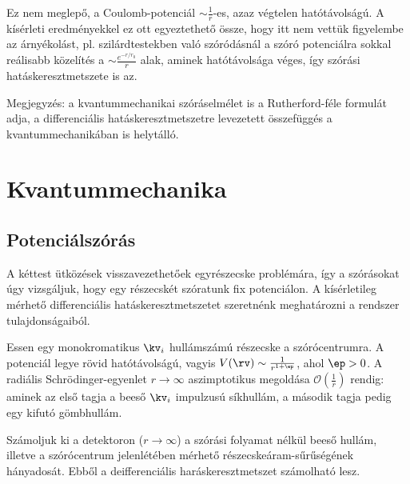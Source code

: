    Ez nem meglepő, a Coulomb-potenciál $\sim\frac{1}{r}$-es, azaz végtelen hatótávolságú.
   A kísérleti eredményekkel ez ott egyeztethető össze, hogy itt nem vettük figyelembe az árnyékolást, pl. szilárdtestekben való szóródásnál a szóró potenciálra sokkal reálisabb közelítés a $\sim\frac{e^{-r/r_0}}{r}$ alak, aminek hatótávolsága véges, így szórási hatáskeresztmetszete is az.
   
   Megjegyzés: a kvantummechanikai szóráselmélet is a Rutherford-féle formulát adja, a differenciális hatáskeresztmetszetre levezetett összefüggés a kvantummechanikában is helytálló. 
   
 \section{Kvantummechanika}
  
  \subsection{Potenciálszórás}
   
   A kéttest ütközések visszavezethetőek egyrészecske problémára, így a szórásokat úgy vizsgáljuk, hogy egy részecskét szóratunk fix potenciálon.
   A kísérletileg mérhető differenciális hatáskeresztmetszetet szeretnénk meghatározni a rendszer tulajdonságaiból.
   
   Essen egy monokromatikus $\kv_i$ hullámszámú részecske a szórócentrumra.
   A potenciál legye rövid hatótávolságú, vagyis $V(\rv)\sim\frac{1}{r^{1+\ep}}$, ahol $\ep>0$.
   A radiális Schrödinger-egyenlet $r\to\infty$ aszimptotikus megoldása $\mathcal{O}\left(\frac{1}{r}\right)$ rendig:
   aminek az első tagja a beeső $\kv_i$ impulzusú síkhullám, a második tagja pedig egy kifutó gömbhullám.
   
   Számoljuk ki a detektoron ($r\to\infty$) a szórási folyamat nélkül beeső hullám, illetve a szórócentrum jelenlétében mérhető részecskeáram-sűrűségének hányadosát.
   Ebből a deifferenciális haráskeresztmetszet számolható lesz.
   
